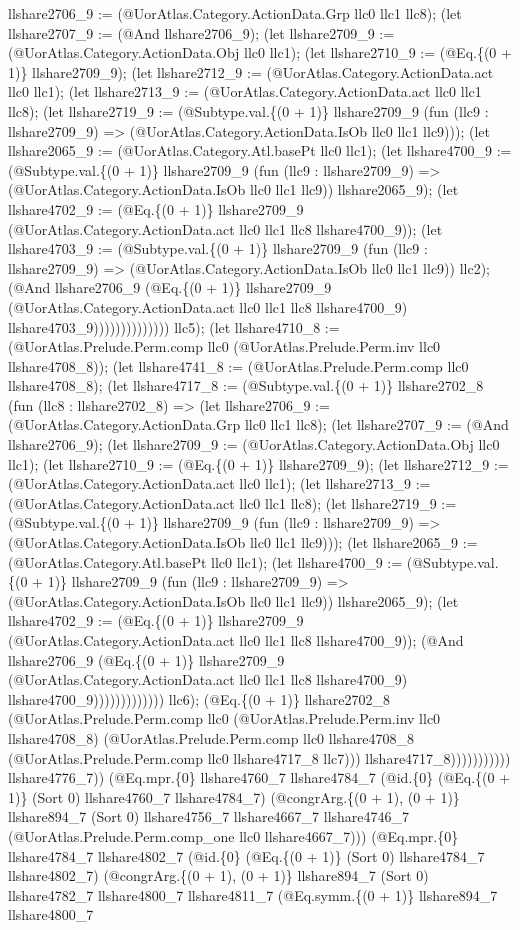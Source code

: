 \documentclass[11pt]{article}
\begin{document}
llshare2706\_9 := (@UorAtlas.Category.ActionData.Grp llc0 llc1 llc8); (let llshare2707\_9 := (@And llshare2706\_9); (let llshare2709\_9 := (@UorAtlas.Category.ActionData.Obj llc0 llc1); (let llshare2710\_9 := (@Eq.\{(0 + 1)\} llshare2709\_9); (let llshare2712\_9 := (@UorAtlas.Category.ActionData.act llc0 llc1); (let llshare2713\_9 := (@UorAtlas.Category.ActionData.act llc0 llc1 llc8); (let llshare2719\_9 := (@Subtype.val.\{(0 + 1)\} llshare2709\_9 (fun (llc9 : llshare2709\_9) => (@UorAtlas.Category.ActionData.IsOb llc0 llc1 llc9))); (let llshare2065\_9 := (@UorAtlas.Category.Atl.basePt llc0 llc1); (let llshare4700\_9 := (@Subtype.val.\{(0 + 1)\} llshare2709\_9 (fun (llc9 : llshare2709\_9) => (@UorAtlas.Category.ActionData.IsOb llc0 llc1 llc9)) llshare2065\_9); (let llshare4702\_9 := (@Eq.\{(0 + 1)\} llshare2709\_9 (@UorAtlas.Category.ActionData.act llc0 llc1 llc8 llshare4700\_9)); (let llshare4703\_9 := (@Subtype.val.\{(0 + 1)\} llshare2709\_9 (fun (llc9 : llshare2709\_9) => (@UorAtlas.Category.ActionData.IsOb llc0 llc1 llc9)) llc2); (@And llshare2706\_9 (@Eq.\{(0 + 1)\} llshare2709\_9 (@UorAtlas.Category.ActionData.act llc0 llc1 llc8 llshare4700\_9) llshare4703\_9)))))))))))))) llc5); (let llshare4710\_8 := (@UorAtlas.Prelude.Perm.comp llc0 (@UorAtlas.Prelude.Perm.inv llc0 llshare4708\_8)); (let llshare4741\_8 := (@UorAtlas.Prelude.Perm.comp llc0 llshare4708\_8); (let llshare4717\_8 := (@Subtype.val.\{(0 + 1)\} llshare2702\_8 (fun (llc8 : llshare2702\_8) => (let llshare2706\_9 := (@UorAtlas.Category.ActionData.Grp llc0 llc1 llc8); (let llshare2707\_9 := (@And llshare2706\_9); (let llshare2709\_9 := (@UorAtlas.Category.ActionData.Obj llc0 llc1); (let llshare2710\_9 := (@Eq.\{(0 + 1)\} llshare2709\_9); (let llshare2712\_9 := (@UorAtlas.Category.ActionData.act llc0 llc1); (let llshare2713\_9 := (@UorAtlas.Category.ActionData.act llc0 llc1 llc8); (let llshare2719\_9 := (@Subtype.val.\{(0 + 1)\} llshare2709\_9 (fun (llc9 : llshare2709\_9) => (@UorAtlas.Category.ActionData.IsOb llc0 llc1 llc9))); (let llshare2065\_9 := (@UorAtlas.Category.Atl.basePt llc0 llc1); (let llshare4700\_9 := (@Subtype.val.\{(0 + 1)\} llshare2709\_9 (fun (llc9 : llshare2709\_9) => (@UorAtlas.Category.ActionData.IsOb llc0 llc1 llc9)) llshare2065\_9); (let llshare4702\_9 := (@Eq.\{(0 + 1)\} llshare2709\_9 (@UorAtlas.Category.ActionData.act llc0 llc1 llc8 llshare4700\_9)); (@And llshare2706\_9 (@Eq.\{(0 + 1)\} llshare2709\_9 (@UorAtlas.Category.ActionData.act llc0 llc1 llc8 llshare4700\_9) llshare4700\_9))))))))))))) llc6); (@Eq.\{(0 + 1)\} llshare2702\_8 (@UorAtlas.Prelude.Perm.comp llc0 (@UorAtlas.Prelude.Perm.inv llc0 llshare4708\_8) (@UorAtlas.Prelude.Perm.comp llc0 llshare4708\_8 (@UorAtlas.Prelude.Perm.comp llc0 llshare4717\_8 llc7))) llshare4717\_8))))))))))) llshare4776\_7)) (@Eq.mpr.\{0\} llshare4760\_7 llshare4784\_7 (@id.\{0\} (@Eq.\{(0 + 1)\} (Sort 0) llshare4760\_7 llshare4784\_7) (@congrArg.\{(0 + 1), (0 + 1)\} llshare894\_7 (Sort 0) llshare4756\_7 llshare4667\_7 llshare4746\_7 (@UorAtlas.Prelude.Perm.comp\_one llc0 llshare4667\_7))) (@Eq.mpr.\{0\} llshare4784\_7 llshare4802\_7 (@id.\{0\} (@Eq.\{(0 + 1)\} (Sort 0) llshare4784\_7 llshare4802\_7) (@congrArg.\{(0 + 1), (0 + 1)\} llshare894\_7 (Sort 0) llshare4782\_7 llshare4800\_7 llshare4811\_7 (@Eq.symm.\{(0 + 1)\} llshare894\_7 llshare4800\_7 
\end{document}
